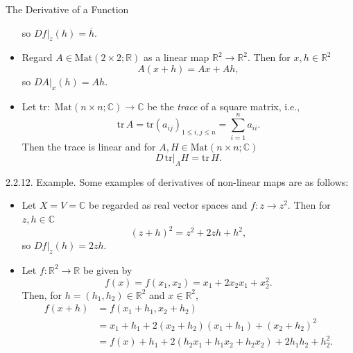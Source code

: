 \documentclass[smaller,hyperref={CJKbookmarks=true}]{beamer}
\newcommand{\C}{\mathbb{C}} \newcommand{\F}{\mathbb{F}} \newcommand{\R}{\mathbb{R}} \newcommand{\Q}{\mathbb{Q}}
\begin{document}
\begin{frame}{The Derivative of a Function}
\begin{spacing}{0.95}
\begin{itemize}
      so $Df|_z(h)=\overline{h}$.
  \newpage
\vspace*{16pt}
  \item Regard $A\in\text{Mat}(2\times 2;\R)$ as a linear map $\R^2\to\R^2$. Then for $x,h\in\R^2$
      \[A(x+h)=Ax+Ah,\]
      so $DA|_x(h)=Ah$.
  \item Let tr:~$\text{Mat}(n\times n;\C)\to\C$ be the \emph{trace} of a square matrix, i.e.,
      \[\text{tr}\,A=\text{tr}(a_{ij})_{1\leq i,j\leq n}=\sum_{i=1}^{n}a_{ii}.\]
      Then the trace is linear and for $A,H\in\text{Mat}(n\times n;\C)$
      \[D\,\text{tr}|_AH=\text{tr}\,H.\]
\end{itemize}
\newpage
\alert{2.2.12. Example.} Some examples of derivatives of non-linear maps are as follows:
\begin{itemize}
  \item Let $X=V=\C$ be regarded as real vector spaces and $f:z\to z^2$. Then for $z,h\in\C$
      \[(z+h)^2=z^2+2zh+h^2,\]
      so $Df|_z(h)=2zh$.
  \item Let $f:\R^2\to\R$ be given by
  \[f(x)=f(x_1,x_2)=x_1+2x_2x_1+x_2^2.\]
  Then, for $h=(h_1,h_2)\in\R^2$ and $x\in\R^2$,
  \begin{equation*}
    \begin{split}
       f(x+h) &=f(x_1+h_1,x_2+h_2) \\
         &=x_1+h_1+2(x_2+h_2)(x_1+h_1)+(x_2+h_2)^2  \\
         &=f(x)+h_1+2(h_2x_1+h_1x_2+h_2x_2)+2h_1h_2+h_2^2.
    \end{split}
  \end{equation*}
\end{itemize}
\end{spacing}
\end{frame}
\end{document}
